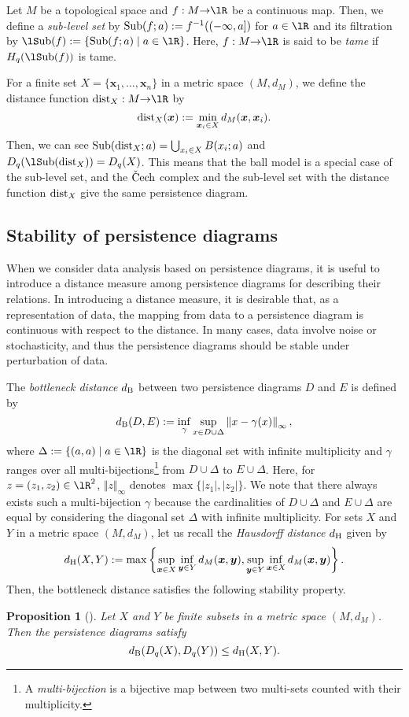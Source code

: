 \documentclass{article}
\newtheorem{prop}[thm]{Proposition}
\newcommand{\DD}{{\Delta}}
\newcommand{\ra}{{\rightarrow}}
\newcommand{\cech}{{\rm \check{C}ech}}
\newcommand{\Sub}{{\rm {\lS}ub}}
\newcommand{\dist}{{\rm dist}}
\providecommand{\norm}[1]{\left\lVert#1\right\rVert}
\begin{document}
Let $M$ be a topological space and $f:M \ra \lR$ be a continuous map.
Then, we define a {\em sub-level set} by ${\rm Sub}(f;a):=f^{-1}((-\infty,a])$ for $a \in \lR$ and its filtration by $\Sub(f):=\{{\rm Sub}(f;a) \mid a \in \lR \}$.
Here, $f:M \ra \lR$ is said to be {\em tame} if $H_{q}(\Sub(f))$ is tame.

For a finite set $X=\{\bm{x}_1, \ldots, \bm{x}_n \}$ in a metric space $(M, d_{M})$, we define the distance function $\dist_{X}:M \ra \lR$ by 
\[
\dist_{X}(\bm{x}):=\min_{\bm{x}_{i} \in X} d_{M} (\bm{x},\bm{x}_{i}).
\]
Then, we can see ${\rm Sub}(\dist_{X};a)=\bigcup_{x_{i} \in X} B(x_{i};a)$ and $D_{q}(\Sub(\dist_{X}))=D_{q}(X)$.
This means that the ball model is a special case of the sub-level set, and the $\cech$ complex and the sub-level set with the distance function $\dist_{X}$ give the same persistence diagram.
 
\subsection{Stability of persistence diagrams}
\label{sec:bottleneck_stability}

When we consider data analysis based on persistence diagrams, it is useful to introduce a distance measure among persistence diagrams for describing their relations.
In introducing a distance measure, it is desirable that, as a representation of data, the mapping from data to a persistence diagram is continuous with respect to the distance.
In many cases, data involve noise or stochasticity, and thus the persistence diagrams should be stable under perturbation of data.

The {\em bottleneck distance} $d_{{\rm B}}$ between two persistence diagrams $D$ and $E$ is defined by
\[
d_{{\rm B}}(D,E):=\inf_{\gamma} \sup_{x \in D \cup \DD} \norm{x-\gamma(x)}_{\infty},
\]
where $\DD:=\{(a,a) \mid a \in \lR \}$ is the diagonal set with infinite multiplicity and $\gamma$ ranges over all multi-bijections\footnote{A {\em multi-bijection} is a bijective map between two multi-sets counted with their multiplicity.} from $D \cup \DD$ to $E \cup \DD$.
Here, for $z=(z_1,z_2)\in\lR^2$, $\Vert z \Vert_\infty$ denotes $\max \{|z_1|,|z_2| \}$. 
We note that there always exists such a multi-bijection $\gamma$ because the cardinalities of $D \cup \DD$ and $E \cup \DD$ are equal by considering the diagonal set $\Delta$ with infinite multiplicity.
For sets $X$ and $Y$ in a metric space $(M, d_{M})$, let us recall the {\em Hausdorff distance} $d_{{\rm H}}$ given by
\begin{align*}
d_{{\rm H}}(X,Y):= \max \left\{\sup_{\bm{x} \in X} \inf_{\bm{y} \in Y} d_{M}(\bm{x},\bm{y}), \sup_{\bm{y} \in Y} \inf_{\bm{x} \in X} d_{M}(\bm{x},\bm{y}) \right\}.
\end{align*}
Then, the bottleneck distance satisfies the following stability property.
\begin{prop}[\cite{CdSO14,CEH07}]
\label{prop:point_stability}
Let $X$ and $Y$ be finite subsets in a metric space $(M,d_{M})$.
Then the persistence diagrams satisfy
\[
d_{{\rm B}}(D_{q}(X),D_{q}(Y)) \leq d_{{\rm H}}(X,Y).
\]
\end{prop}
\end{document}
